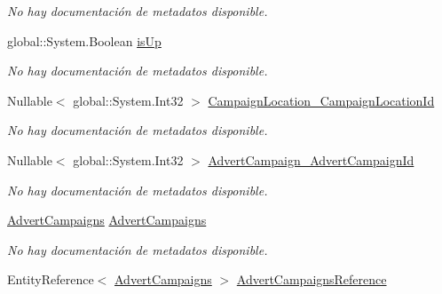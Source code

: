 \begin{DoxyCompactItemize}
\begin{DoxyCompactList}\small\item\em No hay documentación de metadatos disponible. \end{DoxyCompactList}\item 
global\-::\-System.\-Boolean \hyperlink{class_microsoft_1_1_samples_1_1_kinect_1_1_basic_interactions_1_1_advert_hosts_a6f03490cfb61306c9ff66d8f7708fce5}{is\-Up}
\begin{DoxyCompactList}\small\item\em No hay documentación de metadatos disponible. \end{DoxyCompactList}\item 
Nullable$<$ global\-::\-System.\-Int32 $>$ \hyperlink{class_microsoft_1_1_samples_1_1_kinect_1_1_basic_interactions_1_1_advert_hosts_ad7537a128be2d4b46c9bd0131e7ec6b8}{Campaign\-Location\-\_\-\-Campaign\-Location\-Id}
\begin{DoxyCompactList}\small\item\em No hay documentación de metadatos disponible. \end{DoxyCompactList}\item 
Nullable$<$ global\-::\-System.\-Int32 $>$ \hyperlink{class_microsoft_1_1_samples_1_1_kinect_1_1_basic_interactions_1_1_advert_hosts_a39b2c51809d174bf900c68256a16a16b}{Advert\-Campaign\-\_\-\-Advert\-Campaign\-Id}
\begin{DoxyCompactList}\small\item\em No hay documentación de metadatos disponible. \end{DoxyCompactList}\item 
\hyperlink{class_microsoft_1_1_samples_1_1_kinect_1_1_basic_interactions_1_1_advert_campaigns}{Advert\-Campaigns} \hyperlink{class_microsoft_1_1_samples_1_1_kinect_1_1_basic_interactions_1_1_advert_hosts_a5a25e1ac9f59a04bef31c9e632f5f26f}{Advert\-Campaigns}
\begin{DoxyCompactList}\small\item\em No hay documentación de metadatos disponible. \end{DoxyCompactList}\item 
Entity\-Reference$<$ \hyperlink{class_microsoft_1_1_samples_1_1_kinect_1_1_basic_interactions_1_1_advert_campaigns}{Advert\-Campaigns} $>$ \hyperlink{class_microsoft_1_1_samples_1_1_kinect_1_1_basic_interactions_1_1_advert_hosts_ab1354104a98afd6002151d106c3f2f1c}{Advert\-Campaigns\-Reference}

\end{DoxyCompactItemize}
